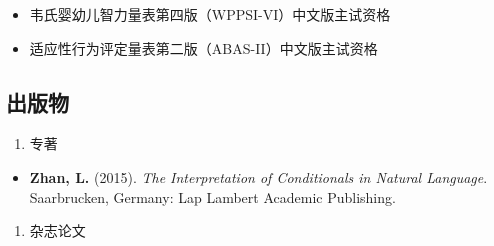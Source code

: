 \documentclass[
  12pt,
]{article}
\providecommand{\tightlist}{%
  \setlength{\itemsep}{0pt}\setlength{\parskip}{0pt}}
\begin{document}
\begin{itemize}
\item
  韦氏婴幼儿智力量表第四版（WPPSI-VI）中文版主试资格
\item
  适应性行为评定量表第二版（ABAS-II）中文版主试资格
\end{itemize}

\hypertarget{ux51faux7248ux7269}{%
\subsection{出版物}\label{ux51faux7248ux7269}}

\begin{enumerate}
\def\labelenumi{\arabic{enumi}.}
\tightlist
\item
  专著
\end{enumerate}

\begin{itemize}
\tightlist
\item
  \textbf{Zhan, L.} (2015). \emph{The Interpretation of Conditionals in
  Natural Language}. Saarbrucken, Germany: Lap Lambert Academic
  Publishing.
\end{itemize}

\begin{enumerate}
\def\labelenumi{\arabic{enumi}.}
\setcounter{enumi}{1}
\tightlist
\item
  杂志论文
\end{enumerate}
\end{document}
